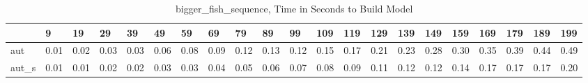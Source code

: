 \begin{table}
\caption{bigger_fish_sequence, Time in Seconds to Build Model}
\label{bigger_fish_sequence_model_time}
\begin{tabular}{lllllllllllllllllllll}
\toprule
 & 9 & 19 & 29 & 39 & 49 & 59 & 69 & 79 & 89 & 99 & 109 & 119 & 129 & 139 & 149 & 159 & 169 & 179 & 189 & 199 \\
\midrule
aut & 0.01 & 0.02 & 0.03 & 0.03 & 0.06 & 0.08 & 0.09 & 0.12 & 0.13 & 0.12 & 0.15 & 0.17 & 0.21 & 0.23 & 0.28 & 0.30 & 0.35 & 0.39 & 0.44 & 0.49 \\
aut_s & 0.01 & 0.01 & 0.02 & 0.02 & 0.03 & 0.03 & 0.04 & 0.05 & 0.06 & 0.07 & 0.08 & 0.09 & 0.11 & 0.12 & 0.12 & 0.14 & 0.17 & 0.17 & 0.17 & 0.20 \\
\bottomrule
\end{tabular}
\end{table}
